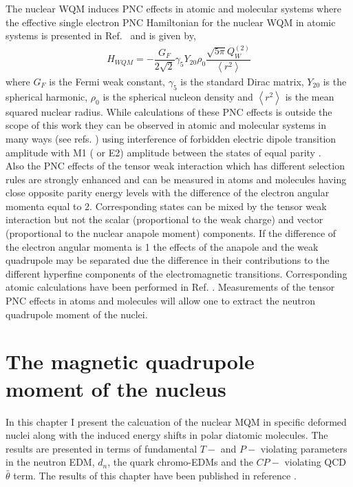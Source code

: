 \documentclass[10pt,a4paper, twoside, openright]{report}
\begin{document}
The nuclear WQM induces PNC effects in atomic and molecular systems where the effective single electron  PNC Hamiltonian for the nuclear WQM in atomic systems is presented in Ref.~\cite{FDC17} and is given by,
\begin{align*}
H_{WQM}=-\dfrac{G_F}{2\sqrt{2}}\gamma_5Y_{20}\rho_{0}\dfrac{\sqrt{5\pi}Q_{W}^{(2)}}{\left<r^2\right>}
\end{align*}
where $G_F$ is the Fermi weak constant, $\gamma_5$ is the standard Dirac matrix, $Y_{20}$ is the spherical harmonic, $\rho_0$ is the spherical nucleon density and $\left<r^2\right>$ is the mean squared nuclear radius. While calculations of these PNC effects is outside the scope of this work they can be observed in atomic and molecular systems in many ways (see refs. \cite{FDC17, Roberts2015, KhriplovichPNC, GingesReview}) using interference of forbidden electric dipole transition amplitude with M1 ( or E2) amplitude between the states of equal parity \cite{FDC17}.\\
\linebreak
Also the PNC effects of the tensor weak interaction which has different selection rules are strongly enhanced  and can be measured in atoms and molecules having close opposite parity energy levels with the difference of the electron angular momenta equal to 2. Corresponding states can be mixed by the tensor weak interaction but not the scalar (proportional to the  weak charge) and vector (proportional to the nuclear anapole moment) components. If the difference of the electron angular momenta is 1 the effects of the anapole and the weak quadrupole may be separated due the difference in their contributions to the different hyperfine components of the electromagnetic transitions. Corresponding atomic calculations have been performed in Ref.  \cite{FDC17}. Measurements of the tensor PNC effects in atoms and molecules will allow one to extract  the neutron quadrupole moment of the nuclei. \\

\chapter[The magnetic quadrupole moment of the nucleus]{The magnetic quadrupole \\ moment of the nucleus} \label{chap:MQM}
In this chapter I present the calcuation of the nuclear MQM in specific deformed nuclei along with the induced energy shifts in polar diatomic molecules. The results are presented in terms of fundamental $T-$ and $P-$ violating parameters in the neutron EDM, $d_n$, the quark chromo-EDMs and the $CP-$ violating QCD $\bar{\theta}$ term. The results of this chapter have been published in reference \cite{LFMQM2018}.
\end{document}
